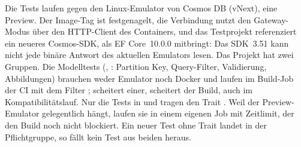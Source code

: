 \begin{note}
  Die Tests laufen gegen den Linux-Emulator von Cosmos DB (vNext), eine Preview. Der Image-Tag
  ist festgenagelt, die Verbindung nutzt den Gateway-Modus über den HTTP-Client des Containers,
  und das Testprojekt referenziert ein neueres Cosmos-SDK, als EF Core~10.0.0 mitbringt: Das
  SDK~3.51 kann nicht jede binäre Antwort des aktuellen Emulators lesen. Das Projekt hat zwei
  Gruppen. Die Modelltests (, :
  Partition Key, Query-Filter, Validierung, Abbildungen) brauchen weder Emulator noch Docker und laufen im Build-Job der CI mit dem
  Filter ; scheitert einer, scheitert der Build, auch im
  Kompatibilitätslauf. Nur die Tests in  und
   tragen den Trait
  . Weil der Preview-Emulator gelegentlich hängt, laufen sie
  in einem eigenen Job mit Zeitlimit, der den Build noch nicht blockiert. Ein neuer Test ohne
  Trait landet in der Pflichtgruppe, so fällt kein Test aus beiden heraus.
\end{note}

